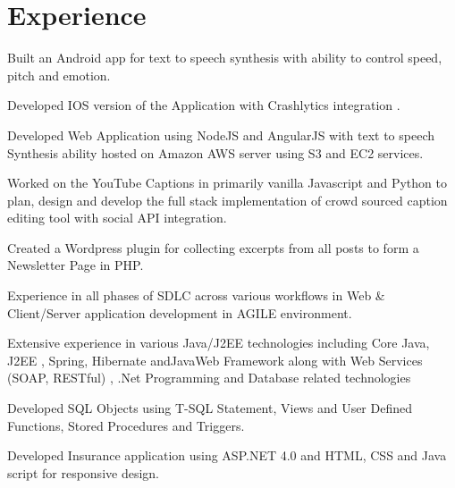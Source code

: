 \documentclass[]{deedy-resume-openfont}
\begin{document}
\hfill
\begin{minipage}[t]{0.66\textwidth}


\section{Experience}

\vspace{\topsep} %
\begin{tightemize}
\item Built an Android app for text to speech synthesis with ability to control speed, pitch and emotion.
\item Developed IOS version of the Application with Crashlytics integration .
\item Developed Web Application using NodeJS and AngularJS with text to speech Synthesis ability hosted on Amazon AWS server using S3 and EC2 services.

\end{tightemize}
\sectionsep

\begin{tightemize}
\item Worked on the YouTube Captions in primarily vanilla Javascript and Python to plan, design and develop the full stack implementation of crowd sourced caption editing tool with social API  integration.
\item Created a Wordpress plugin for collecting excerpts from all posts to form a Newsletter Page in PHP.

\end{tightemize}
\sectionsep

\begin{tightemize}
\item Experience in all phases of SDLC across various workflows in Web \& Client/Server application development in AGILE environment.
\item Extensive experience in various Java/J2EE technologies including Core Java, J2EE , Spring, Hibernate andJavaWeb Framework along with Web Services (SOAP, RESTful) , .Net Programming and Database related technologies
\item Developed SQL Objects using T-SQL Statement, Views and User Defined Functions, Stored Procedures and Triggers.
\item Developed Insurance application using ASP.NET 4.0 and HTML, CSS and Java script for responsive design.


\end{tightemize}
\end{minipage}
\end{document}
